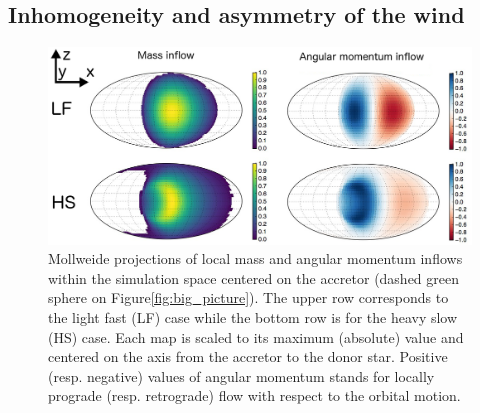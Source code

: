 \documentclass{aa}
\begin{document}
\subsection{Inhomogeneity and asymmetry of the wind}
\label{sec:orb_inhomo}

\begin{figure}
\centering
\includegraphics[width=2\columnwidth]{Pictures/inflow_maps.png}
\caption{Mollweide projections of local mass and angular momentum inflows within the simulation space centered on the accretor (dashed green sphere on Figure\ref{fig:big_picture}). The upper row corresponds to the light fast (LF) case while the bottom row is for the heavy slow (HS) case. Each map is scaled to its maximum (absolute) value and centered on the axis from the accretor to the donor star. Positive (resp. negative) values of angular momentum stands for locally prograde (resp. retrograde) flow with respect to the orbital motion.}
\label{fig:inflow_maps}
\end{figure} 
\end{document}
